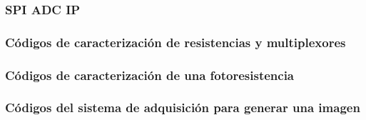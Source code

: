     \newpage	  
	  \subsubsection{SPI ADC IP}
	  

    	  
    
	\newpage 
	  \subsubsection{Códigos de caracterización de resistencias y multiplexores}	  
	  
    

    
    
	 \newpage
    

    

	 \newpage    	
    	  
    
    
    	
    	    
    
	  \subsubsection{Códigos de caracterización de una fotoresistencia}	
	        
    	 	  
    
	  \subsubsection{Códigos del sistema de adquisición para generar una imagen}	
	  
